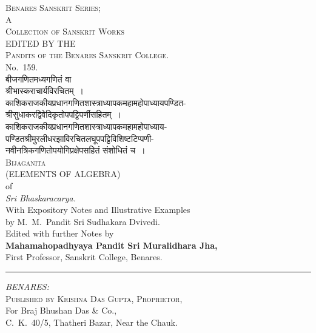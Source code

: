 \documentclass[11pt,a4paper]{article}
\newcommand{\shortline}{\noindent\rule{0.5\textwidth}{0.4pt}\par}
\begin{document}
\clearpage

\thispagestyle{empty}
\vspace*{3cm}
\begin{center}
{\large\scshape Benares Sanskrit Series;}\\[0.2cm]
{\normalsize A}\\[0.1cm]
{\large\scshape Collection of Sanskrit Works}\\[0.3cm]
{\footnotesize EDITED BY THE}\\[0.1cm]
{\normalsize\scshape Pandits of the Benares Sanskrit College.}\\[0.2cm]
{\normalsize No.~159.}\\[0.6cm]
{\LARGE\devanagarifont बीजगणितमध्यगणितं वा}\\[0.4cm]
{\Large\devanagarifont श्रीभास्कराचार्यविरचितम्~।}\\[0.5cm]
{\footnotesize\devanagarifont काशिकराजकीयप्रधानगणितशास्त्राध्यापकमहामहोपाध्यायपण्डित-}\\[0.1cm]
{\footnotesize\devanagarifont श्रीसुधाकरद्विवेदिकृतोपपट्टिपर्णीसहितम्~।}\\[0.3cm]
{\footnotesize\devanagarifont काशिकराजकीयप्रधानगणितशास्त्राध्यापकमहामहोपाध्याय-}\\[0.1cm]
{\footnotesize\devanagarifont पण्डितश्रीमुरलीधरझाविरचितलघूपपट्टिविशिष्टटिप्पणी-}\\[0.1cm]
{\footnotesize\devanagarifont नवीनत्रिकगणितोपयोगिप्रक्षेपसहितं संशोधितं च~।}\\[0.5cm]
{\Huge\scshape Bijaganita}\\[0.3cm]
{\normalsize (ELEMENTS OF ALGEBRA)}\\[0.2cm]
{\normalsize of}\\[0.2cm]
{\normalsize\itshape Sri Bhaskaracarya.}\\[0.3cm]
{\small With Expository Notes and Illustrative Examples}\\[0.1cm]
{\small by M.~M.~Pandit Sri Sudhakara Dvivedi.}\\[0.2cm]
{\small Edited with further Notes by}\\[0.1cm]
{\normalsize\bfseries Mahamahopadhyaya Pandit Sri Muralidhara Jha,}\\[0.1cm]
{\footnotesize First Professor, Sanskrit College, Benares.}\\[0.4cm]
\shortline
\vspace{0.3cm}
{\normalsize\itshape BENARES:}\\[0.2cm]
{\normalsize\scshape Published by Krishna Das Gupta, Proprietor,}\\[0.1cm]
{\small For Braj Bhushan Das \& Co.,}\\[0.1cm]
{\small C.~K.~40/5, Thatheri Bazar, Near the Chauk.}
\vspace{2cm}
\end{center}
\clearpage
\end{document}
